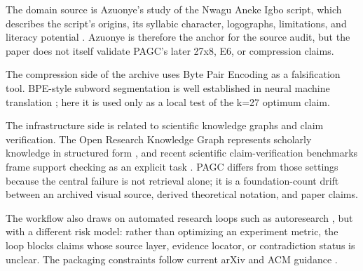 The domain source is Azuonye's study of the Nwagu Aneke Igbo script, which describes the script's origins, its syllabic character, logographs, limitations, and literacy potential \cite{Azuonye1992}. Azuonye is therefore the anchor for the source audit, but the paper does not itself validate PAGC's later 27x8, E6, or compression claims.

The compression side of the archive uses Byte Pair Encoding as a falsification tool. BPE-style subword segmentation is well established in neural machine translation \cite{Sennrich2016}; here it is used only as a local test of the k=27 optimum claim.

The infrastructure side is related to scientific knowledge graphs and claim verification. The Open Research Knowledge Graph represents scholarly knowledge in structured form \cite{Jaradeh2019}, and recent scientific claim-verification benchmarks frame support checking as an explicit task \cite{Ho2026}. PAGC differs from those settings because the central failure is not retrieval alone; it is a foundation-count drift between an archived visual source, derived theoretical notation, and paper claims.

The workflow also draws on automated research loops such as autoresearch \cite{Karpathy2026}, but with a different risk model: rather than optimizing an experiment metric, the loop blocks claims whose source layer, evidence locator, or contradiction status is unclear. The packaging constraints follow current arXiv and ACM guidance \cite{ArxivTeXLive2026,ACMSubmissions2026}.

